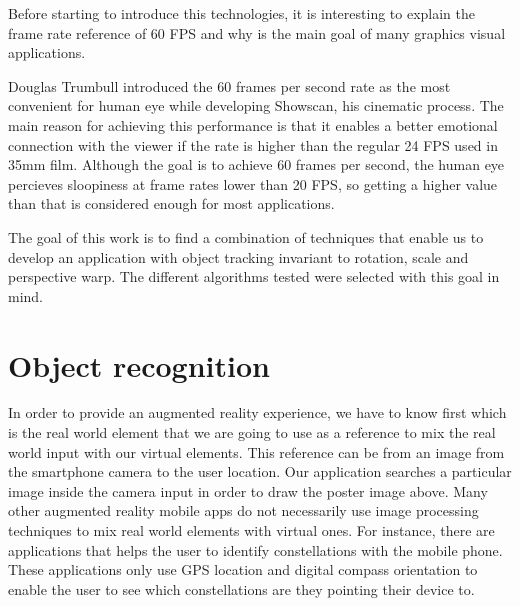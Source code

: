 Before starting to
introduce this technologies, it is interesting to explain the frame rate
reference of 60 FPS and why is the main goal of many graphics visual
applications.

Douglas Trumbull introduced the 60 frames per second rate as the most
convenient for human eye while developing Showscan, his cinematic process. The
main reason for achieving this performance is that it enables a better
emotional connection with the viewer if the rate is higher than the regular 24
FPS used in 35mm film. Although the goal is to achieve 60 frames per second,
the human eye percieves sloopiness at frame rates lower than 20 FPS, so getting
a higher value than that is considered enough for most applications.

The goal of this work is to find a combination of techniques that enable us to
develop an application with object tracking invariant to rotation, scale and
perspective warp. The different algorithms tested were selected with this goal
in mind. 



\section{Object recognition}
In order to provide an augmented reality experience, we have to know first
which is the real world element that we are going to use as a reference to mix
the real world input with our virtual elements. This reference can be from an
image from the smartphone camera to the user location. Our application searches a
particular image inside the camera input in order to draw the poster image
above. Many other augmented reality mobile apps do not necessarily use image
processing techniques to mix real world elements with virtual ones. For
instance, there are applications that helps the user to identify constellations
with the mobile phone. These applications only use GPS location and digital
compass orientation to enable the user to see which constellations are they
pointing their device to.

